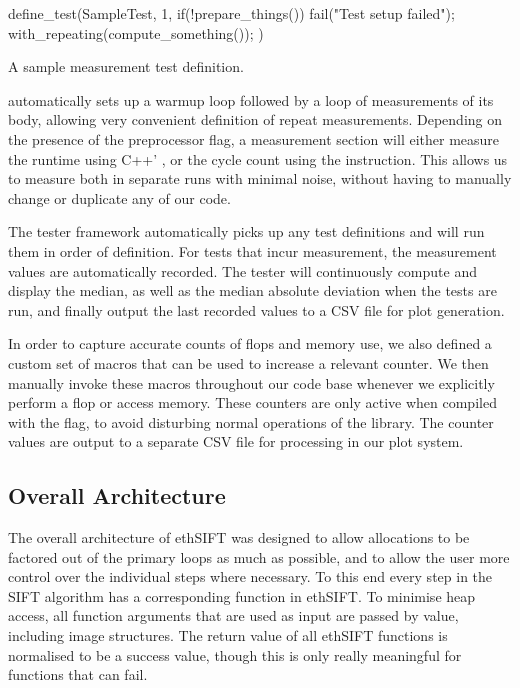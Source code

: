 \documentclass[letterpaper]{article}
\begin{document}
\begin{listing}[ht]
\begin{ccode}
define_test(SampleTest, 1, {
    if(!prepare_things())
      fail("Test setup failed");
    with_repeating(compute_something());
  })
\end{ccode}
\caption{A sample measurement test definition.}
\label{lst:sample-test}
\end{listing}

 automatically sets up a warmup loop followed by a loop of measurements of its body, allowing very convenient definition of repeat measurements. Depending on the presence of the  preprocessor flag, a measurement section will either measure the runtime using C++' , or the cycle count using the  instruction. This allows us to measure both in separate runs with minimal noise, without having to manually change or duplicate any of our code.

The tester framework automatically picks up any test definitions and will run them in order of definition. For tests that incur measurement, the measurement values are automatically recorded. The tester will continuously compute and display the median, as well as the median absolute deviation when the tests are run, and finally output the last recorded values to a CSV file for plot generation.

In order to capture accurate counts of flops and memory use, we also defined a custom set of macros that can be used to increase a relevant counter. We then manually invoke these macros throughout our code base whenever we explicitly perform a flop or access memory. These counters are only active when compiled with the  flag, to avoid disturbing normal operations of the library. The counter values are output to a separate CSV file for processing in our plot system.

\subsection*{Overall Architecture}\label{sec:architecture}
The overall architecture of ethSIFT was designed to allow allocations to be factored out of the primary loops as much as possible, and to allow the user more control over the individual steps where necessary. To this end every step in the SIFT algorithm has a corresponding function in ethSIFT. To minimise heap access, all function arguments that are used as input are passed by value, including image structures. The return value of all ethSIFT functions is normalised to be a success value, though this is only really meaningful for functions that can fail.
\end{document}
